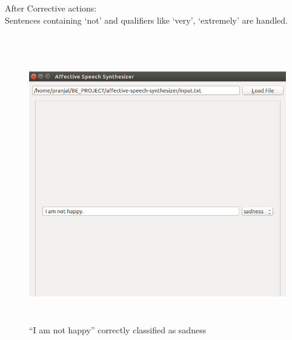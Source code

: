 \documentclass[oneside,a4paper,12pt]{book}
\begin{document}
\begin{appendices}
\newpage
After Corrective actions:\\
Sentences containing ‘not’ and qualifiers like ‘very’, ‘extremely’ are handled.\\\\
\begin{figure}[ht]
	\centering
	\includegraphics[width=400pt, height=340pt]{later.png}
	\caption{“I am not happy” correctly classified as sadness}
	\label{fig:“I am not happy” correctly classified as sadness}
\end{figure}


\end{appendices}
\end{document}
